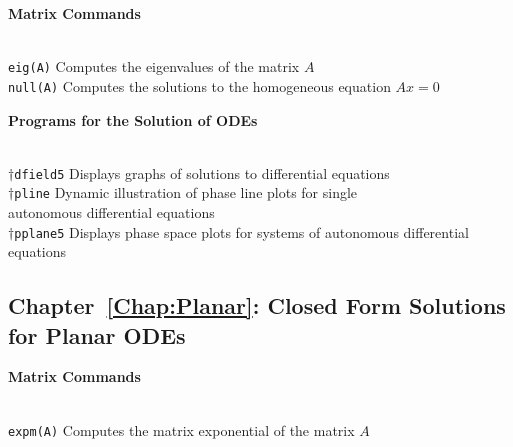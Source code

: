 \documentclass{ximera}
\begin{document}
\centerline{
{\bf Matrix Commands}
} \vspace*{-0.1in}
 
\begin{tabbing}
 \hspace{1.1in} \= \\

     {\tt eig(A)}   \>
 Computes the eigenvalues of the matrix $A$ \\

     {\tt null(A)}   \>
 Computes the solutions to the homogeneous equation $Ax=0$ \\
\end{tabbing}



\centerline{
{\bf Programs for the Solution of ODEs}
} \vspace*{-0.1in}
 
\begin{tabbing}
 \hspace{1.1in} \= \\

     $\dagger${\tt dfield5}   \>
 Displays graphs of solutions to differential
                        equations   \\
 
       $\dagger${\tt pline}   \>
 Dynamic illustration of phase line plots for single\\
\>			autonomous differential equations \\
 
       $\dagger${\tt pplane5}   \>
 Displays phase space plots for systems of
			autonomous differential equations 
\end{tabbing}


\subsection*{Chapter~\ref{Chap:Planar}: Closed Form Solutions for Planar ODEs}



\centerline{
{\bf Matrix Commands}
} \vspace*{-0.1in}
 
\begin{tabbing}
 \hspace{1.1in} \= \\

     {\tt expm(A)}   \>
 Computes the matrix exponential of the matrix $A$  

\end{tabbing}
\end{document}
